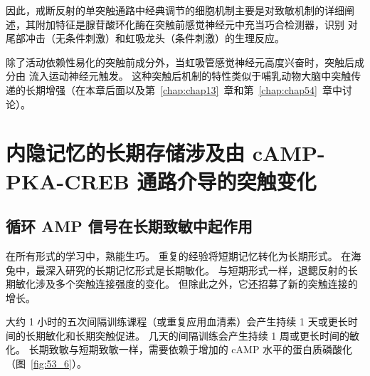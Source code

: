 因此，戒断反射的单突触通路中经典调节的细胞机制主要是对致敏机制的详细阐述，其附加特征是腺苷酸环化酶在突触前感觉神经元中充当巧合检测器，识别 对尾部冲击（无条件刺激）和虹吸龙头（条件刺激）的生理反应。


除了活动依赖性易化的突触前成分外，当虹吸管感觉神经元高度兴奋时，突触后成分由  流入运动神经元触发。
这种突触后机制的特性类似于哺乳动物大脑中突触传递的长期增强（在本章后面以及第~\ref{chap:chap13}~章和第~\ref{chap:chap54}~章中讨论）。



\section{内隐记忆的长期存储涉及由 cAMP-PKA-CREB 通路介导的突触变化}

\subsection{循环 AMP 信号在长期致敏中起作用}

在所有形式的学习中，熟能生巧。
重复的经验将短期记忆转化为长期形式。
在海兔中，最深入研究的长期记忆形式是长期敏化。
与短期形式一样，退鳃反射的长期敏化涉及多个突触连接强度的变化。
但除此之外，它还招募了新的突触连接的增长。


大约 1 小时的五次间隔训练课程（或重复应用血清素）会产生持续 1 天或更长时间的长期敏化和长期突触促进。
几天的间隔训练会产生持续 1 周或更长时间的敏化。
长期致敏与短期致敏一样，需要依赖于增加的 cAMP 水平的蛋白质磷酸化（图~\ref{fig:53_6}）。


